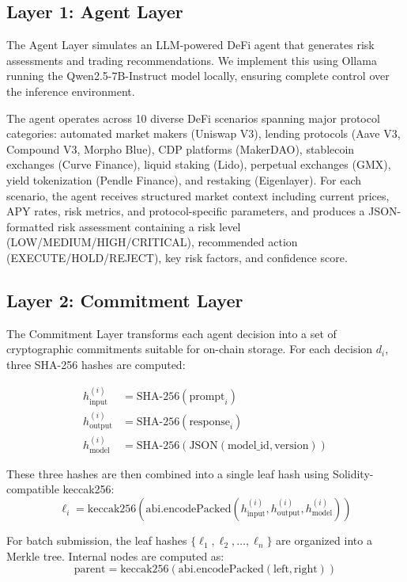 \documentclass[manuscript,nonacm]{acmart}
\begin{document}
\subsection{Layer 1: Agent Layer}

The Agent Layer simulates an LLM-powered DeFi agent that generates risk assessments and trading recommendations. We implement this using Ollama~\cite{ollama} running the Qwen2.5-7B-Instruct model locally, ensuring complete control over the inference environment.

The agent operates across 10 diverse DeFi scenarios spanning major protocol categories: automated market makers (Uniswap V3), lending protocols (Aave V3, Compound V3, Morpho Blue), CDP platforms (MakerDAO), stablecoin exchanges (Curve Finance), liquid staking (Lido), perpetual exchanges (GMX), yield tokenization (Pendle Finance), and restaking (Eigenlayer). For each scenario, the agent receives structured market context including current prices, APY rates, risk metrics, and protocol-specific parameters, and produces a JSON-formatted risk assessment containing a risk level (LOW/MEDIUM/HIGH/CRITICAL), recommended action (EXECUTE/HOLD/REJECT), key risk factors, and confidence score.

\subsection{Layer 2: Commitment Layer}

The Commitment Layer transforms each agent decision into a set of cryptographic commitments suitable for on-chain storage. For each decision $d_i$, three SHA-256 hashes are computed:

\begin{align}
h_{\text{input}}^{(i)} &= \text{SHA-256}(\text{prompt}_i) \\
h_{\text{output}}^{(i)} &= \text{SHA-256}(\text{response}_i) \\
h_{\text{model}}^{(i)} &= \text{SHA-256}(\text{JSON}(\text{model\_id}, \text{version}))
\end{align}

These three hashes are then combined into a single leaf hash using Solidity-compatible keccak256:
\begin{equation}
\ell_i = \text{keccak256}(\text{abi.encodePacked}(h_{\text{input}}^{(i)}, h_{\text{output}}^{(i)}, h_{\text{model}}^{(i)}))
\end{equation}

For batch submission, the leaf hashes $\{\ell_1, \ell_2, \ldots, \ell_n\}$ are organized into a Merkle tree. Internal nodes are computed as:
\begin{equation}
\text{parent} = \text{keccak256}(\text{abi.encodePacked}(\text{left}, \text{right}))
\end{equation}
\end{document}
